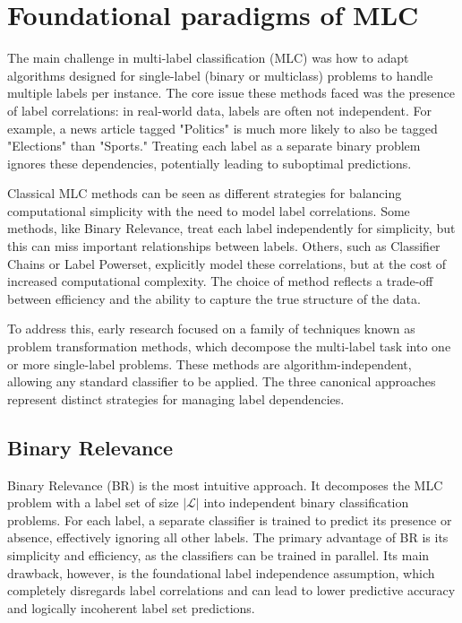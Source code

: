 \section{Foundational paradigms of MLC}
The main challenge in multi-label classification (MLC) was how to adapt algorithms designed for single-label (binary or multiclass) problems to handle multiple labels per instance. The core issue these methods faced was the presence of label correlations: in real-world data, labels are often not independent. For example, a news article tagged "Politics" is much more likely to also be tagged "Elections" than "Sports." Treating each label as a separate binary problem ignores these dependencies, potentially leading to suboptimal predictions.

Classical MLC methods can be seen as different strategies for balancing computational simplicity with the need to model label correlations. Some methods, like Binary Relevance, treat each label independently for simplicity, but this can miss important relationships between labels. Others, such as Classifier Chains or Label Powerset, explicitly model these correlations, but at the cost of increased computational complexity. The choice of method reflects a trade-off between efficiency and the ability to capture the true structure of the data.

To address this, early research focused on a family of techniques known as problem transformation methods, which decompose the multi-label task into one or more single-label problems. These methods are algorithm-independent, allowing any standard classifier to be applied. The three canonical approaches represent distinct strategies for managing label dependencies.

\subsection{Binary Relevance}
Binary Relevance (BR) is the most intuitive approach. It decomposes the MLC problem with a label set of size $|\mathcal{L}|$ into independent binary classification problems. For each label, a separate classifier is trained to predict its presence or absence, effectively ignoring all other labels. \cite{zhang_binary_2018} The primary advantage of BR is its simplicity and efficiency, as the classifiers can be trained in parallel. Its main drawback, however, is the foundational label independence assumption, which completely disregards label correlations and can lead to lower predictive accuracy and logically incoherent label set predictions. \cite{Sucar2014Multi-label}

